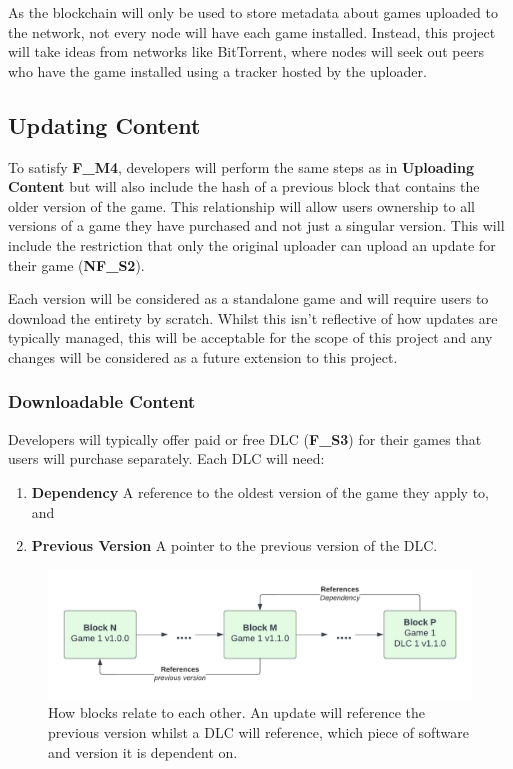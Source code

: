 \vspace{2mm}\noindent As the blockchain will only be used to store metadata about games uploaded to the network, not every node will have each game installed. Instead, this project will take ideas from networks like BitTorrent, where nodes will seek out peers who have the game installed using a tracker hosted by the uploader.

\subsection*{Updating Content}

To satisfy \textbf{F\_M4}, developers will perform the same steps as in \textbf{Uploading Content} but will also include the hash of a previous block that contains the older version of the game. This relationship will allow users ownership to all versions of a game they have purchased and not just a singular version. This will include the restriction that only the original uploader can upload an update for their game (\textbf{NF\_S2}).

\vspace{2mm}\noindent Each version will be considered as a standalone game and will require users to download the entirety by scratch. Whilst this isn't reflective of how updates are typically managed, this will be acceptable for the scope of this project and any changes will be considered as a future extension to this project.

\subsubsection*{Downloadable Content}

Developers will typically offer paid or free DLC (\textbf{F\_S3}) for their games that users will purchase separately. Each DLC will need:

\begin{enumerate}
  \item \textbf{Dependency} A reference to the oldest version of the game they apply to, and
  \item \textbf{Previous Version} A pointer to the previous version of the DLC.
\end{enumerate}

\begin{figure}[ht]
  \centering
  \includegraphics[width=.85\textwidth]{assets/images/diagrams/software.png}
  \caption{How blocks relate to each other. An update will reference the previous version whilst a DLC will reference, which piece of software and version it is dependent on.}
\end{figure}

